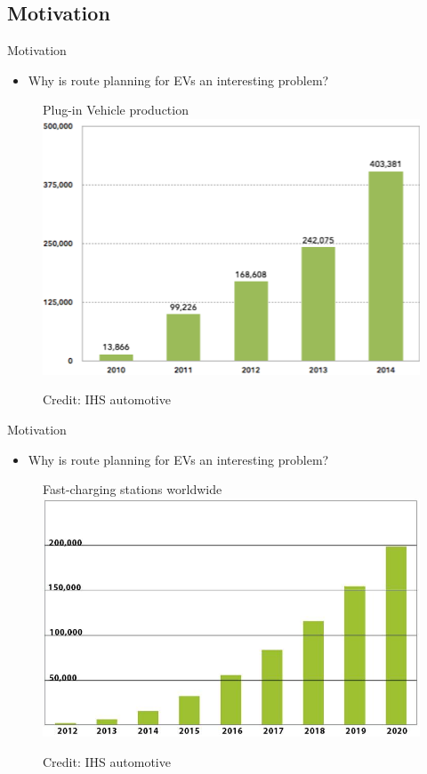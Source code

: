 \subsection{Motivation}
\begin{frame}{Motivation}
\begin{itemize}
\item Why is route planning for EVs an interesting problem?
\end{itemize}
\begin{figure}[h!]
  \centering
  Plug-in Vehicle production
    \includegraphics[height=0.5\textwidth]{images/forecast}
  
      \tiny Credit: IHS automotive
\end{figure}

\end{frame}
\begin{frame}{Motivation}
\begin{itemize}
\item Why is route planning for EVs an interesting problem?
\end{itemize}
\begin{figure}[h!]
  \centering
  Fast-charging stations worldwide
    \includegraphics[height=0.5\textwidth]{images/forecast2}
  
      \tiny Credit: IHS automotive
\end{figure}
\end{frame}
